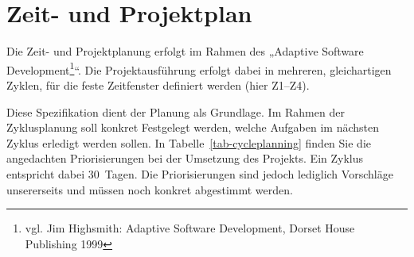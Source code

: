 \section{Zeit- und Projektplan}

Die Zeit- und Projektplanung erfolgt im Rahmen des „Adaptive Software
Development\footnote{vgl. Jim Highsmith: Adaptive Software Development, Dorset
House Publishing 1999}“. Die Projektausführung erfolgt dabei in mehreren,
gleichartigen Zyklen, für die feste Zeitfenster definiert werden (hier
Z1--Z4). 




Diese Spezifikation dient der Planung als Grundlage. Im Rahmen der
Zyklusplanung soll konkret Festgelegt werden, welche Aufgaben im nächsten
Zyklus erledigt werden sollen.  In Tabelle~\ref{tab-cycleplanning} finden Sie
die angedachten Priorisierungen bei der Umsetzung des Projekts. Ein Zyklus
entspricht dabei 30~Tagen. Die Priorisierungen sind jedoch lediglich
Vorschläge unsererseits und müssen noch konkret abgestimmt werden.



